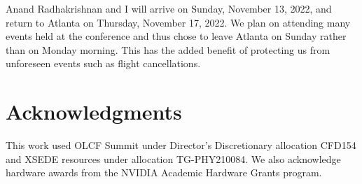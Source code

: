 \documentclass{lxaiproposal}
\begin{document}
Anand Radhakrishnan and I will arrive on Sunday, November 13, 2022, and return to Atlanta on Thursday, November 17, 2022. We plan on attending many events held at the conference and thus chose to leave Atlanta on Sunday rather than on Monday morning. This has the added benefit of protecting us from unforeseen events such as flight cancellations.

\section*{Acknowledgments}

This work used OLCF Summit under Director's Discretionary allocation CFD154 and
XSEDE resources under allocation TG-PHY210084.
We also acknowledge hardware awards from the NVIDIA Academic Hardware Grants
program.



\end{document}
